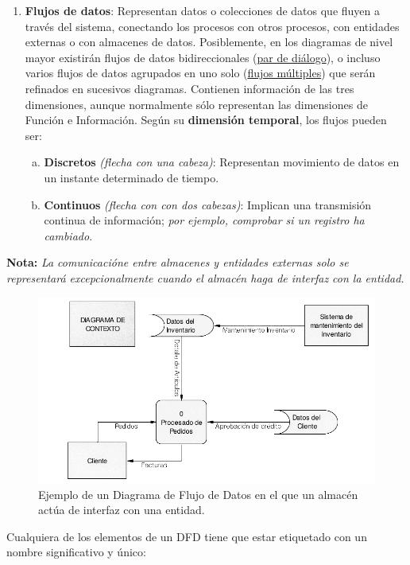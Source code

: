 \begin{enumerate}
    \item \textbf{Flujos de datos}: Representan datos o colecciones de datos que fluyen a través del sistema, conectando los procesos con otros procesos, con entidades externas o con almacenes de datos. Posiblemente, en los diagramas de nivel mayor existirán flujos de datos bidireccionales (\uline{par de diálogo}), o incluso varios flujos de datos agrupados en uno solo (\uline{flujos múltiples}) que serán refinados en sucesivos diagramas. Contienen información de las tres dimensiones, aunque normalmente sólo representan las dimensiones de Función e Información. Según su \textbf{dimensión temporal}, los flujos pueden ser:
          \begin{enumerate}[a.]
              \item \textbf{Discretos} \textit{(flecha con una cabeza)}: Representan movimiento de datos en un instante determinado de tiempo.
              \item \textbf{Continuos} \textit{(flecha con con dos cabezas)}: Implican una transmisión continua de información; \textit{por ejemplo, comprobar si un registro ha cambiado}.
          \end{enumerate}
\end{enumerate}

\textbf{Nota:} \textit{La comunicacióne entre almacenes y entidades externas solo se representará excepcionalmente cuando el almacén haga de interfaz con la entidad.}

\begin{figure}[h!]
    \centering
    \includegraphics[width=0.8\linewidth]{Resources/Tema5/ejemploDFDInterfazAlmacen.png}
    \caption{Ejemplo de un Diagrama de Flujo de Datos en el que un almacén actúa de interfaz con una entidad.}
    \label{fig:ejemploDFDInterfazAlmacen}
\end{figure}

Cualquiera de los elementos de un DFD tiene que estar etiquetado con un nombre significativo y único:

